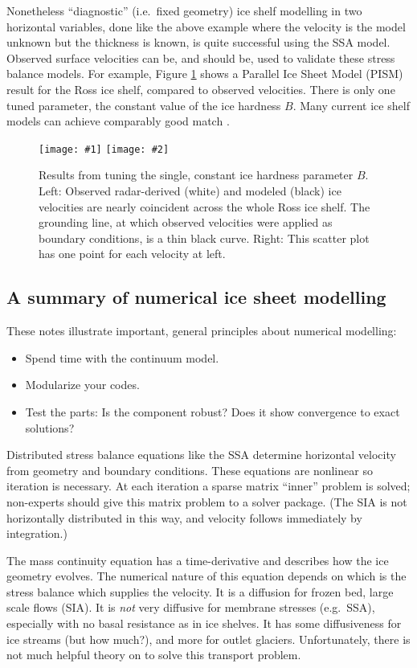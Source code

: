 \documentclass[titlepage,a4paper,final,12pt]{scrartcl}
\newcommand{\twofigsizes}[5]{
\begin{figure}[ht]
\centering
\texttt{[image: \#1]} \quad
\texttt{[image: \#2]}
\caption{#3}
\label{fig:#1}
\end{figure}}
\begin{document}
Nonetheless ``diagnostic'' (i.e.~fixed geometry) ice shelf modelling in two horizontal variables, done like the above example where the velocity is the model unknown but the thickness is known, is quite successful using the SSA model.  Observed surface velocities can be, and should be, used to validate these stress balance models.  For example, Figure \ref{fig:rossquiver} shows a Parallel Ice Sheet Model (PISM) result for the Ross ice shelf, compared to observed velocities.  There is only one tuned parameter, the constant value of the ice hardness $B$.  Many current ice shelf models can achieve comparably good match \cite{MacAyealetal}.

\twofigsizes{rossquiver}{rossscatter}{Results from tuning the single, constant ice hardness parameter $B$.  Left: Observed radar-derived (white) and modeled (black) ice velocities are nearly coincident across the whole Ross ice shelf.  The grounding line, at which observed velocities were applied as boundary conditions, is a thin black curve.  Right: This scatter plot has one point for each velocity at left.}{3.1in}{2.7in}


\subsection{A summary of numerical ice sheet modelling}

These notes illustrate important, general principles about numerical modelling:
\begin{itemize}
\item Spend time with the continuum model.
\item Modularize your codes.
\item Test the parts: Is the component robust? Does it show convergence to exact solutions?
\end{itemize}

Distributed stress balance equations like the SSA determine horizontal velocity from geometry and boundary conditions.  These equations are nonlinear so iteration is necessary.  At each iteration a sparse matrix ``inner'' problem is solved; non-experts should give this matrix problem to a solver package.  (The SIA is not horizontally distributed in this way, and velocity follows immediately by integration.)

The mass continuity equation has a time-derivative and describes how the ice geometry evolves.  The numerical nature of this equation depends on which is the stress balance which supplies the velocity.  It is a diffusion for frozen bed, large scale flows (SIA).  It is \emph{not} very diffusive for membrane stresses (e.g.~SSA), especially with no basal resistance as in ice shelves.  It has some diffusiveness for ice streams (but how much?), and more for outlet glaciers.  Unfortunately, there is not much helpful theory on to solve this transport problem.
\end{document}
